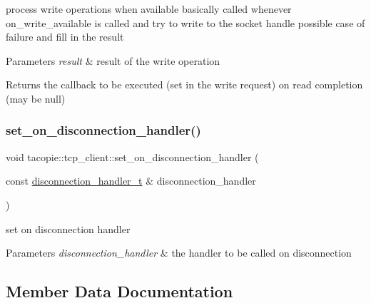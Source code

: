 process write operations when available basically called whenever on\+\_\+write\+\_\+available is called and try to write to the socket handle possible case of failure and fill in the result


\begin{DoxyParams}{Parameters}
{\em result} & result of the write operation \\
\hline
\end{DoxyParams}
\begin{DoxyReturn}{Returns}
the callback to be executed (set in the write request) on read completion (may be null) 
\end{DoxyReturn}
\mbox{\label{classtacopie_1_1tcp__client_a8c290d681186edb0578051c04f3c0762}} 
\subsubsection{\texorpdfstring{set\+\_\+on\+\_\+disconnection\+\_\+handler()}{set\_on\_disconnection\_handler()}}
{\footnotesize\ttfamily void tacopie\+::tcp\+\_\+client\+::set\+\_\+on\+\_\+disconnection\+\_\+handler (\begin{DoxyParamCaption}\item[{const \hyperlink{classtacopie_1_1tcp__client_aca5df52e5ee6fa673cf212532ada1453}{disconnection\+\_\+handler\+\_\+t} \&}]{disconnection\+\_\+handler }\end{DoxyParamCaption})}

set on disconnection handler


\begin{DoxyParams}{Parameters}
{\em disconnection\+\_\+handler} & the handler to be called on disconnection \\
\hline
\end{DoxyParams}


\subsection{Member Data Documentation}
\mbox{\label{classtacopie_1_1tcp__client_a5ee7259fe6a8258515162e1ed516de20}} 
